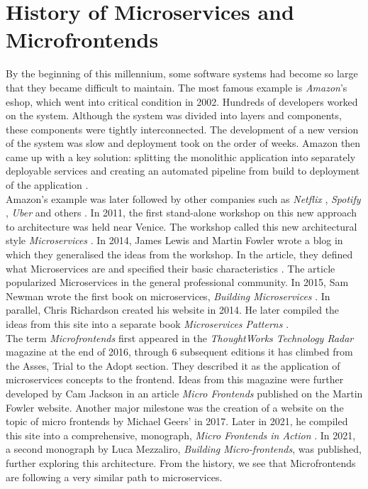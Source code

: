 \section{History of Microservices and Microfrontends}
By the beginning of this millennium, some software systems had become so large that they became difficult to maintain. The most famous example is \emph{Amazon}'s \cite{Amazon} eshop, which went into critical condition in 2002. Hundreds of developers worked on the system. Although the system was divided into layers and components, these components were tightly interconnected. The development of a new version of the system was slow and deployment took on the order of weeks. Amazon then came up with a key solution: splitting the monolithic application into separately deployable services and creating an automated pipeline from build to deployment of the application \cite{Brigham}. \\

\noindent
Amazon's example was later followed by other companies such as \emph{Netflix} \cite{Netflix}, \emph{Spotify} \cite{Spotify}, \emph{Uber} \cite{Uber} and others \cite{Kwiecień}. In 2011, the first stand-alone workshop on this new approach to architecture was held near Venice. The workshop called this new architectural style \emph{Microservices} \cite{Fowler}. In 2014, James Lewis and Martin Fowler wrote a blog in which they generalised the ideas from the workshop. In the article, they defined what Microservices are and specified their basic characteristics \cite{Fowler}. The article popularized Microservices in the general professional community. In 2015, Sam Newman wrote the first book on microservices, \emph{Building Microservices} \cite{NewmanBuildingMicroservices}. In parallel, Chris Richardson created his website \cite{RichardsonWeb} in 2014. He later compiled the ideas from this site into a separate book \emph{Microservices Patterns} \cite{RichardsonPatterns}. \\

\noindent
The term \emph{Microfrontends} first appeared in the \emph{ThoughtWorks Technology Radar} magazine \cite{ThoughtWorksRadar} at the end of 2016, through 6 subsequent editions it has climbed from the Asses, Trial to the Adopt section. They described it as the application of microservices concepts to the frontend. Ideas from this magazine were further developed by Cam Jackson in an article \emph{Micro Frontends} published on the Martin Fowler website. Another major milestone was the creation of a website on the topic of micro frontends by Michael Geers' \cite{GeersWeb} in 2017. Later in 2021, he compiled this site into a comprehensive, monograph, \emph{Micro Frontends in Action} \cite{Geers}. In 2021, a second monograph by Luca Mezzaliro, \emph{Building Micro-frontends}, was published, further exploring this architecture. From the history, we see that Microfrontends are following a very similar path to microservices.
